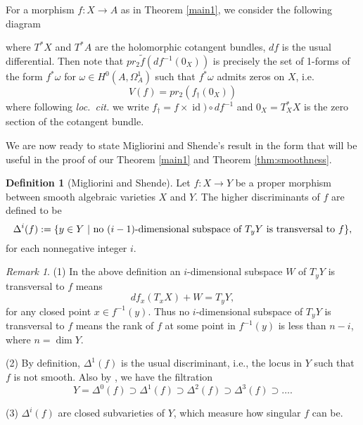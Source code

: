 \documentclass[a4paper,12pt,reqno]{amsart}
\theoremstyle{plain}
\theoremstyle{definition}
\newtheorem{definition}[theorem]{Definition}
\theoremstyle{remark}
\newtheorem{remark}[theorem]{Remark}
\newcommand{\id}{\operatorname{id}}
\newcommand{\pr}{\operatorname{pr}}
\begin{document}
For a morphism $f: X\to A$ as in Theorem \ref{main1},  we consider the following diagram 
\begin{center}
\end{center}
 where $T^*X$ and $T^*A$ are the holomorphic cotangent bundles, 
$df$ is the usual differential. Then note
that $pr_2\tilde{f}(df^{-1}(0_X))$ is precisely the 
set of 1-forms of the form $f^*\omega$ for $\omega\in H^0(A, \Omega_A^1)$ such that $f^*\omega$ admits zeros on $X$,
i.e.\
\[V(f) = pr_2(f_{\dagger}(0_X))\]
where following \emph{loc.\ cit.} we write $f_{\dagger} = f\times \id)\circ df^{-1}$ and $0_X = T_X^*X$ is the zero section
of the cotangent bundle. 

We are now ready to state Migliorini and Shende's
result \cite{MiSh} in the form that will be useful in the proof of our Theorem \ref{main1} and Theorem \ref{thm:smoothness}.

\begin{definition}[Migliorini and Shende]\label{def:higherdiscriminants}
Let $f: X\to Y$ be a proper morphism between smooth algebraic  varieties $X$ and $Y$. The higher discriminants of $f $ are defined to be
$$\Delta^i(f):=\{ y\in Y\ |\ \textnormal{no}\ (i-1)\textnormal{-dimensional subspace of}\  T_yY \ \textnormal{is transversal to} \ f \},$$ for each nonnegative integer $i$.
\end{definition}

\begin{remark}
(1) In the above definition an $i$-dimensional subspace $W$ of $T_yY$ is transversal to $f$ means $$df_x(T_xX)+W=T_yY,$$ for any closed point $x\in f^{-1}(y)$. Thus no $i$-dimensional subspace of $T_yY$ is transversal to $f$ means the rank of $f$ at some point in $f^{-1}(y)$ is less than $n-i$, where $n=\dim Y$.

(2) By definition, $\Delta^1(f)$ is the usual discriminant, i.e., the locus in $Y$ such that $f$ is not smooth. Also by \cite[Proposition 10.6]{Har77}, we have the filtration  $$Y=\Delta^0(f)\supset \Delta^1(f)\supset\Delta^2(f)\supset\Delta^3(f)\supset\ldots.$$

(3) $\Delta^i(f)$ are closed subvarieties of $Y$, which measure how singular $f$ can be.
\end{remark}
\end{document}
